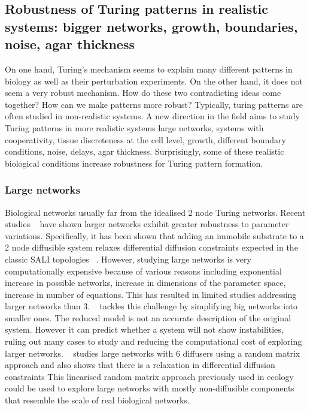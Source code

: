 \subsection{Robustness of Turing patterns in realistic systems: bigger networks, growth, boundaries, noise, agar thickness}
On one hand, Turing's mechanism seems to explain many different patterns in biology as well as their perturbation experiments.
On the other hand, it does not seem a very robust mechanism.
How do these two contradicting ideas come together?
How can we make patterns more robust?
Typically, turing patterns are often studied in non-realistic systems.
A new direction in the field aims to study Turing patterns in more realistic systems large networks, systems with cooperativity, tissue discreteness at the cell level, growth, different boundary conditions, noise, delays, agar thickness. Surprisingly, some of these realistic biological conditions increase robustness for Turing pattern formation. %

\subsubsection{Large networks}
Biological networks usually far from the idealised 2 node Turing networks. %
Recent studies ~\parencite{Zheng2016, Scholes2019, Marcon} have shown larger networks exhibit greater robustness to parameter variations.
Specifically, it has been shown that adding an immobile substrate to a 2 node diffusible system relaxes differential diffusion constraints expected in the classic SALI topologies ~\parencite{korvasova2015}.
However, studying large networks is very computationally expensive because of various reasons including exponential increase in possible networks, increase in dimensions of the parameter space, increase in number of equations.
This has resulted in limited studies addressing larger networks than 3.
~\cite{Smith2018a} tackles this challenge by simplifying big networks into smaller ones.
The reduced model is not an accurate description of the original system.
However it can predict whether a system will not show instabilities, ruling out many cases to study and reducing the computational cost of exploring larger networks.
~\cite{Haas2021} studies large networks with 6 diffusers using a random matrix approach and also shows that there is a relaxation in differential diffusion constraints
This linearised random matrix approach previously used in ecology ~\parencite{May1972} could be used to explore large networks with mostly non-diffusible components that resemble the scale of real biological networks. %

